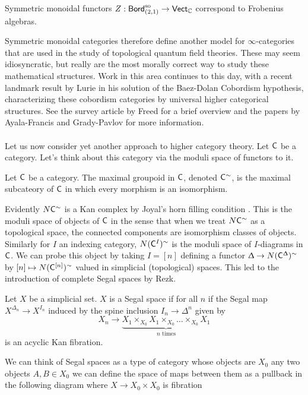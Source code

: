 \begin{theorem}
    Symmetric monoidal functors $Z:\mathsf{Bord}_{(2,1)}^{\mathrm{so}}\to\mathsf{Vect}_{\mathbb{C}}$ correspond to Frobenius algebras. 
\end{theorem}
Symmetric monoidal categories therefore define another model for $\infty$-categories that are used in the study of topological quantum field theories. These may seem idiosyncratic, but really are the most morally correct way to study these mathematical structures. Work in this area continues to this day, with a recent landmark result by Lurie in his solution of the Baez-Dolan Cobordism hypothesis, characterizing these cobordism categories by universal higher categorical structures. See the survey article by Freed \cite{Freed} for a brief overview and the papers by Ayala-Francis \cite{AyalaFrancis} and Grady-Pavlov \cite{GradyPavlov} for more information. 
\\\\
Let us now consider yet another approach to higher category theory. Let $\mathsf{C}$ be a category. Let's think about this category via the moduli space of functors to it. 
\begin{definition}
    Let $\mathsf{C}$ be a category. The maximal groupoid in $\mathsf{C}$, denoted $\mathsf{C}^{\sim}$, is the maximal subcateory of $\mathsf{C}$ in which every morphism is an isomorphism. 
\end{definition}
Evidently $N\mathsf{C}^{\sim}$ is a Kan complex by Joyal's horn filling condition . This is the moduli space of objects of $\mathsf{C}$ in the sense that when we treat $N\mathsf{C}^{\sim}$ as a topological space, the connected components are isomorphism classes of objects. Similarly for $I$ an indexing category, $N(\mathsf{C}^{I})^{\sim}$ is the moduli space of $I$-diagrams in $\mathsf{C}$. We can probe this object by taking $I=[n]$ defining a functor $\Updelta\to N(\mathsf{C}^{\Updelta})^{\sim}$ by $[n]\mapsto N(\mathsf{C}^{[n]})^{\sim}$ valued in simplicial (topological) spaces. This led to the introduction of complete Segal spaces by Rezk. 
\begin{definition}\label{def: segal space}
    Let $X$ be a simplicial set. $X$ is a Segal space if for all $n$ if the Segal map $X^{\Delta_{n}}\to X^{I_{n}}$ induced by the spine inclusion $I_{n}\to\Delta^{n}$ given by 
    $$X_{n}\to\underbrace{X_{1}\times_{X_{0}}X_{1}\times_{X_{0}}\dots\times_{X_{0}}X_{1}}_{n\text{ times}}$$
    is an acyclic Kan fibration. 
\end{definition}
We can think of Segal spaces as a type of category whose objects are $X_{0}$ any two objects $A,B\in X_{0}$ we can define the space of maps between them as a pullback in the following diagram where $X\to X_{0}\times X_{0}$ is fibration 
